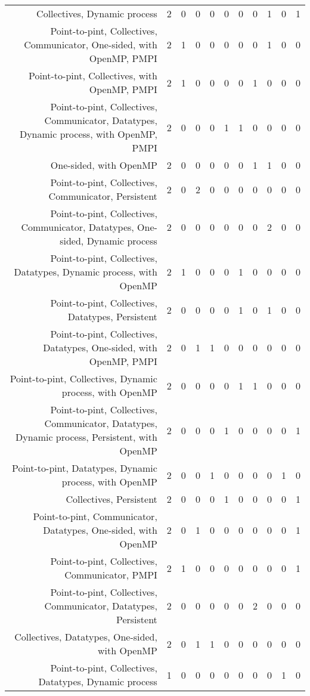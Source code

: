 {\begin{landscape}
\begin{longtable}[htb]{r|c|c|c|c|c|c|c|c|c|c}
{Collectives, Dynamic process} & 2 & 0 & 0 & 0 & 0 & 0 & 0 & 1 & 0 & 1 \\%
{Point-to-pint, Collectives, Communicator, One-sided, with OpenMP, PMPI} & 2 & 1 & 0 & 0 & 0 & 0 & 0 & 1 & 0 & 0 \\%
{Point-to-pint, Collectives, with OpenMP, PMPI} & 2 & 1 & 0 & 0 & 0 & 0 & 1 & 0 & 0 & 0 \\%
{Point-to-pint, Collectives, Communicator, Datatypes, Dynamic process, with OpenMP, PMPI} & 2 & 0 & 0 & 0 & 1 & 1 & 0 & 0 & 0 & 0 \\%
{One-sided, with OpenMP} & 2 & 0 & 0 & 0 & 0 & 0 & 1 & 1 & 0 & 0 \\%
{Point-to-pint, Collectives, Communicator, Persistent} & 2 & 0 & 2 & 0 & 0 & 0 & 0 & 0 & 0 & 0 \\%
{Point-to-pint, Collectives, Communicator, Datatypes, One-sided, Dynamic process} & 2 & 0 & 0 & 0 & 0 & 0 & 0 & 2 & 0 & 0 \\%
{Point-to-pint, Collectives, Datatypes, Dynamic process, with OpenMP} & 2 & 1 & 0 & 0 & 0 & 1 & 0 & 0 & 0 & 0 \\%
{Point-to-pint, Collectives, Datatypes, Persistent} & 2 & 0 & 0 & 0 & 0 & 1 & 0 & 1 & 0 & 0 \\%
{Point-to-pint, Collectives, Datatypes, One-sided, with OpenMP, PMPI} & 2 & 0 & 1 & 1 & 0 & 0 & 0 & 0 & 0 & 0 \\%
{Point-to-pint, Collectives, Dynamic process, with OpenMP} & 2 & 0 & 0 & 0 & 0 & 1 & 1 & 0 & 0 & 0 \\%
{Point-to-pint, Collectives, Communicator, Datatypes, Dynamic process, Persistent, with OpenMP} & 2 & 0 & 0 & 0 & 1 & 0 & 0 & 0 & 0 & 1 \\%
{Point-to-pint, Datatypes, Dynamic process, with OpenMP} & 2 & 0 & 0 & 1 & 0 & 0 & 0 & 0 & 1 & 0 \\%
{Collectives, Persistent} & 2 & 0 & 0 & 0 & 1 & 0 & 0 & 0 & 0 & 1 \\%
{Point-to-pint, Communicator, Datatypes, One-sided, with OpenMP} & 2 & 0 & 1 & 0 & 0 & 0 & 0 & 0 & 0 & 1 \\%
{Point-to-pint, Collectives, Communicator, PMPI} & 2 & 1 & 0 & 0 & 0 & 0 & 0 & 0 & 0 & 1 \\%
{Point-to-pint, Collectives, Communicator, Datatypes, Persistent} & 2 & 0 & 0 & 0 & 0 & 0 & 2 & 0 & 0 & 0 \\%
{Collectives, Datatypes, One-sided, with OpenMP} & 2 & 0 & 1 & 1 & 0 & 0 & 0 & 0 & 0 & 0 \\%
{Point-to-pint, Collectives, Datatypes, Dynamic process} & 1 & 0 & 0 & 0 & 0 & 0 & 0 & 0 & 1 & 0 \\%

\end{longtable}
\end{landscape}}
